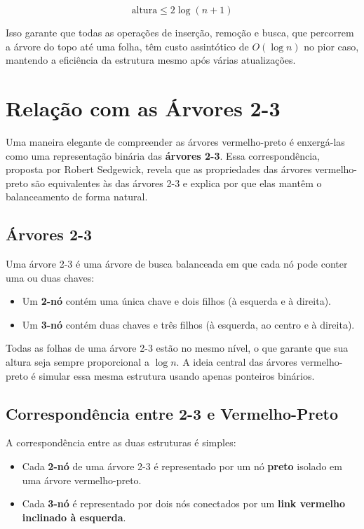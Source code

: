 \[
\text{altura} \leq 2 \log(n + 1)
\]

Isso garante que todas as operações de inserção, remoção e busca, que percorrem a árvore do topo até uma folha, têm custo assintótico de $O(\log n)$ no pior caso, mantendo a eficiência da estrutura mesmo após várias atualizações.


\section{Relação com as Árvores 2-3}

Uma maneira elegante de compreender as árvores vermelho-preto é enxergá-las como uma representação binária das \textbf{árvores 2-3}.
Essa correspondência, proposta por Robert Sedgewick, revela que as propriedades das árvores vermelho-preto são equivalentes às das árvores 2-3 e explica por que elas mantêm o balanceamento de forma natural.

\subsection*{Árvores 2-3}

Uma árvore 2-3 é uma árvore de busca balanceada em que cada nó pode conter uma ou duas chaves:
\begin{itemize}
\item Um \textbf{2-nó} contém uma única chave e dois filhos (à esquerda e à direita).
\item Um \textbf{3-nó} contém duas chaves e três filhos (à esquerda, ao centro e à direita).
\end{itemize}

Todas as folhas de uma árvore 2-3 estão no mesmo nível, o que garante que sua altura seja sempre proporcional a $\log n$.
A ideia central das árvores vermelho-preto é simular essa mesma estrutura usando apenas ponteiros binários.

\subsection*{Correspondência entre 2-3 e Vermelho-Preto}

A correspondência entre as duas estruturas é simples:

\begin{itemize}
\item Cada \textbf{2-nó} de uma árvore 2-3 é representado por um nó \textbf{preto} isolado em uma árvore vermelho-preto.
\item Cada \textbf{3-nó} é representado por dois nós conectados por um \textbf{link vermelho inclinado à esquerda}.
\end{itemize}

